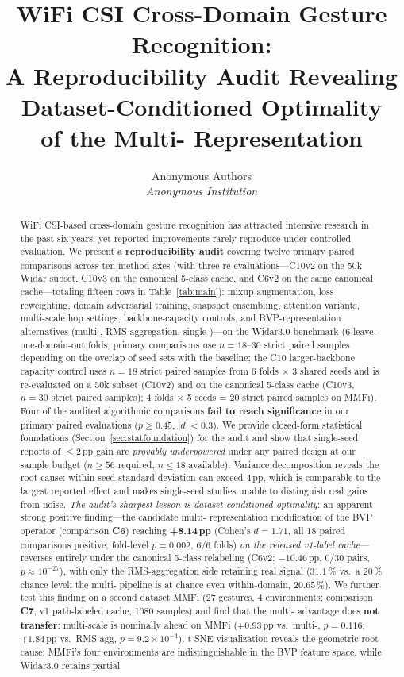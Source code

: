\documentclass[11pt]{article}
\title{WiFi CSI Cross-Domain Gesture Recognition:\\
       A Reproducibility Audit Revealing Dataset-Conditioned Optimality\\
       of the Multi-\Rx{} Representation}
\author{%
    Anonymous Authors\\[2pt]
    \small\textit{Anonymous Institution}
}
\theoremstyle{definition}
\newcommand{\Rx}{\text{Rx}}
\begin{document}
\maketitle

\begin{abstract}
WiFi CSI-based cross-domain gesture recognition has attracted intensive research in the past six years, yet reported improvements rarely reproduce under controlled evaluation. We present a \textbf{reproducibility audit} covering twelve primary paired comparisons across ten method axes (with three re-evaluations---C10v2 on the 50k Widar subset, C10v3 on the canonical 5-class cache, and C6v2 on the same canonical cache---totaling fifteen rows in Table~\ref{tab:main}): mixup augmentation, loss reweighting, domain adversarial training, snapshot ensembling, attention variants, multi-scale hop settings, backbone-capacity controls, and BVP-representation alternatives (multi-\Rx, RMS-aggregation, single-\Rx)---on the Widar3.0 benchmark (6 leave-one-domain-out folds; primary comparisons use $n = 18$--$30$ strict paired samples depending on the overlap of seed sets with the baseline; the C10 larger-backbone capacity control uses $n = 18$ strict paired samples from 6 folds $\times$ 3 shared seeds and is re-evaluated on a 50k subset (C10v2) and on the canonical 5-class cache (C10v3, $n = 30$ strict paired samples); 4 folds $\times$ 5 seeds = 20 strict paired samples on MMFi). Four of the audited algorithmic comparisons \textbf{fail to reach significance} in our primary paired evaluations ($p \geq 0.45$, $|d| < 0.3$). We provide closed-form statistical foundations (Section~\ref{sec:statfoundation}) for the audit and show that single-seed reports of $\le 2$\,pp gain are \emph{provably underpowered} under any paired design at our sample budget ($n \ge 56$ required, $n \le 18$ available). Variance decomposition reveals the root cause: within-seed standard deviation can exceed 4\,pp, which is comparable to the largest reported effect and makes single-seed studies unable to distinguish real gains from noise. \emph{The audit's sharpest lesson is dataset-conditioned optimality}: an apparent strong positive finding---the candidate multi-\Rx{} representation modification of the BVP operator (comparison \textbf{C6}) reaching \textbf{+8.14\,pp} (Cohen's $d = 1.71$, all 18 paired comparisons positive; fold-level $p = 0.002$, 6/6 folds) \emph{on the released v1-label cache}---reverses entirely under the canonical 5-class relabeling (C6v2: $-10.46$\,pp, $0/30$ pairs, $p \approx 10^{-27}$), with only the RMS-aggregation side retaining real signal ($31.1\,\%$ vs.\ a $20\,\%$ chance level; the multi-\Rx{} pipeline is at chance even within-domain, $20.65\,\%$). We further test this finding on a second dataset MMFi (27 gestures, 4 environments; comparison \textbf{C7}, v1 path-labeled cache, 1080 samples) and find that the multi-\Rx{} advantage does \textbf{not transfer}: multi-scale is nominally ahead on MMFi ($+0.93$\,pp vs.\ multi-\Rx, $p = 0.116$; $+1.84$\,pp vs.\ RMS-agg, $p = 9.2\times10^{-4}$). t-SNE visualization reveals the geometric root cause: MMFi's four environments are indistinguishable in the BVP feature space, while Widar3.0 retains partial 
\end{abstract}
\end{document}
